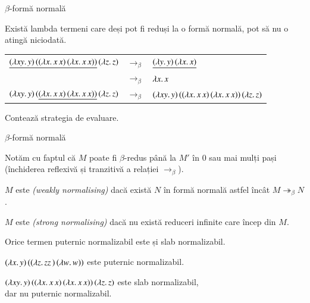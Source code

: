 \documentclass[xcolor=pdftex,romanian,colorlinks]{beamer}
\begin{document}
\begin{frame}[fragile]{$\beta$-formă normală}

Există lambda termeni care deși pot fi reduși la o formă normală, pot să nu o atingă niciodată.

{\footnotesize
\begin{center}
\begin{tabular}{rcl} 
$\underline{(\lambda xy.\,y)\, ((\lambda x.\,x\, x)\, (\lambda x.\,x\, x))}\, (\lambda z.\,z)$ & $\rightarrow_\beta$ & $\underline{(\lambda y.\,y)\, (\lambda x.\,x)}$ \\
&$\rightarrow_\beta$ & $\lambda x.\,x$ \\[.4cm] 
$(\lambda xy.\,y)\, (\underline{(\lambda x.\,x\, x)\, (\lambda x.\,x\, x))}\, (\lambda z.\,z)$ & $\rightarrow_\beta$ &  $(\lambda xy.\,y)\, ((\lambda x.\,x\, x)\, (\lambda x.\,x\, x))\, (\lambda z.\,z)$ \\
\end{tabular}
\end{center}
}

Contează \alert{strategia de evaluare.}
\end{frame}

\begin{frame}[fragile]{$\beta$-formă normală}

Notăm cu  faptul că $M$ poate fi $\beta$-redus până la $M'$ în $0$ sau mai mulți pași  (închiderea reflexivă și tranzitivă a relației $\rightarrow_\beta$).

\medskip
$M$ este  \textit{(weakly normalising)} dacă există $N$ în formă normală astfel încât $M \twoheadrightarrow_\beta N$.

\medskip
$M$ este  \textit{(strong normalising)} dacă nu există reduceri infinite care încep din $M$.

\medskip
Orice termen puternic normalizabil este și slab normalizabil.

\medskip
\begin{example}

\smallskip
$(\lambda x.\,y)\, ((\lambda z.\,zz\, )\, (\lambda w.\,w))$ este {\color{True} puternic normalizabil}.

\smallskip
$(\lambda xy.\,y)\, ((\lambda x.\,x\, x)\, (\lambda x.\,x\, x))\, (\lambda z.\,z)$ este {\color{True} slab normalizabil}, \\ dar {\color{False} nu puternic normalizabil}.



\end{example}
\end{frame}
\end{document}
